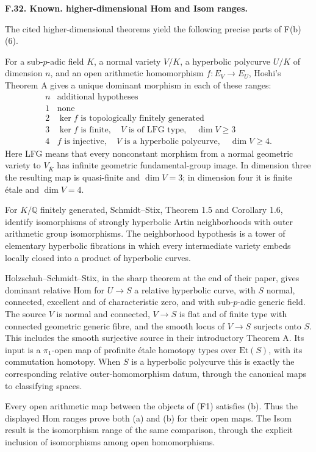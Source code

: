 \documentclass[11pt,oneside]{article}
\makeatletter
\newcounter{statementanchor}
\newenvironment{statement}[3]{%
 \refstepcounter{statementanchor}\def\@currentlabel{#1}%
 \par\addvspace{9pt}\noindent
 \textbf{#1. #2. #3.}\par\nobreak\noindent\ignorespaces
}{\par\addvspace{5pt}}
\makeatother
\begin{document}
\begin{statement}{F.32}{Known}{higher-dimensional Hom and Isom ranges}
\label{st:F.32}
\label{F-higher-dimensional-ranges}
The cited higher-dimensional theorems yield the following precise
parts of F(b)(6).

For a sub-$p$-adic field $K$, a normal variety $V/K$, a hyperbolic
polycurve $U/K$ of dimension $n$, and an open arithmetic
homomorphism $f:E_V\to E_U$, Hoshi's Theorem A gives a unique
dominant morphism in each of these ranges:
\[
\begin{array}{c|l}
n&\text{additional hypotheses}\\ \hline
1&\text{none}\\
2&\ker f\text{ is topologically finitely generated}\\
3&\ker f\text{ is finite},\quad V\text{ is of LFG type},\quad\dim V\ge3\\
4&f\text{ is injective},\quad V\text{ is a hyperbolic polycurve},
       \quad\dim V\ge4 .
\end{array}
\]
Here LFG means that every nonconstant morphism from a normal
geometric variety to $V_{\overline K}$ has infinite geometric
fundamental-group image. In dimension three the resulting map
is quasi-finite and $\dim V=3$; in dimension four it is finite
\'etale and $\dim V=4$.

For $K/\mathbb Q$ finitely generated, Schmidt--Stix, Theorem 1.5
and Corollary 1.6, identify isomorphisms of strongly hyperbolic
Artin neighborhoods with outer arithmetic group isomorphisms.
The neighborhood hypothesis is a tower of elementary hyperbolic
fibrations in which every intermediate variety embeds locally
closed into a product of hyperbolic curves.

Holzschuh--Schmidt--Stix, in the sharp theorem at the end of
their paper, gives dominant relative Hom for $U\to S$ a
relative hyperbolic curve, with $S$ normal, connected,
excellent and of characteristic zero, and with sub-$p$-adic
generic field. The source $V$ is normal and connected,
$V\to S$ is flat and of finite type with connected geometric
generic fibre, and the smooth locus of $V\to S$ surjects onto
$S$. This includes the smooth surjective source in their
introductory Theorem A. Its input is a
$\pi_1$-open map of profinite \'etale homotopy types over
$\mathrm{Et}(S)$, with its commutation homotopy. When $S$ is a
hyperbolic polycurve this is exactly the corresponding relative
outer-homomorphism datum, through the canonical maps to
classifying spaces.

Every open arithmetic map between the objects of (F1) satisfies
(b). Thus the displayed Hom ranges prove both (a) and (b) for
their open maps. The Isom result is the isomorphism range of the
same comparison, through the explicit inclusion of isomorphisms
among open homomorphisms.
\end{statement}
\end{document}
